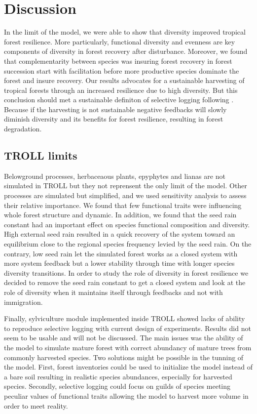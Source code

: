 \documentclass[12pt,]{article}
\let\oldsection\section
\renewcommand\section{\newpage\oldsection}
\theoremstyle{definition}
\theoremstyle{definition}
\theoremstyle{remark}
\begin{document}
\section{Discussion}\label{discussion}

In the limit of the model, we were able to show that diversity improved
tropical forest resilience. More particularly, functional diversity and
evenness are key components of diversity in forest recovery after
disturbance. Moreover, we found that complementarity between species was
insuring forest recovery in forest succession start with facilitation
before more productive species dominate the forest and insure recovery.
Our results advocates for a sustainable harvesting of tropical forests
through an increased resilience due to high diversity. But this
conclusion should met a sustainable definiton of selective logging
following \citet{Zimmerman2012}. Because if the harvesting is not
sustainable negative feedbacks will slowly diminish diversity and its
benefits for forest resilience, resulting in forest degradation.

\subsection{TROLL limits}\label{troll-limits}

Belowground processes, herbaceaous plants, epyphytes and lianas are not
simulated in TROLL but they not reprensent the only limit of the model.
Other processes are simulated but simplified, and we used sensitivity
analysis to assess their relative importance. We found that few
functional traits were influencing whole forest structure and dynamic.
In addition, we found that the seed rain constant had an important
effect on species functional composition and diversity. High external
seed rain resulted in a quick recovery of the system toward an
equilibrium close to the regional species frequency levied by the seed
rain. On the contrary, low seed rain let the simulated forest works as a
closed system with more system feedback but a lower stability through
time with longer species diversity transitions. In order to study the
role of diversity in forest resilience we decided to remove the seed
rain constant to get a closed system and look at the role of diversity
when it maintains itself through feedbacks and not with immigration.

Finally, sylviculture module implemented inside TROLL showed lacks of
ability to reproduce selective logging with current design of
experiments. Results did not seem to be usable and will not be
discussed. The main issues was the ability of the model to simulate
mature forest with correct abundancy of mature trees from commonly
harvested species. Two solutions might be possible in the tunning of the
model. First, forest inventories could be used to initialize the model
instead of a bare soil resulting in realistic species abundances,
especially for harvested species. Secondly, selective logging could
focus on guilds of species meeting peculiar values of functional traits
\citep[as wood density, see][]{Huth2004, Khler2004, Ruger2008} allowing
the model to harvest more volume in order to meet reality.
\end{document}
